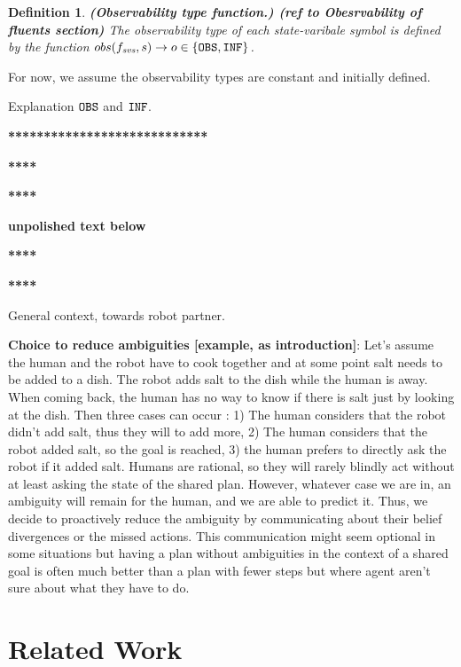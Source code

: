 \documentclass[letterpaper]{article} %
\newtheorem{definition}{Definition}
\begin{document}
\begin{definition}
\textbf{(Observability type function.) (ref to Obesrvability of fluents section)}
The observability type of each \textit{state-varibale symbol} is defined by the function $obs(f_{\textit{svs}}, s) \rightarrow o \in\{\texttt{OBS}, \texttt{INF}\}$.
\end{definition}
For now, we assume the observability types are constant and initially defined.

Explanation $\texttt{OBS}$ and $\texttt{INF}$.


\textbf{****************************}

\textbf{**** }

\textbf{**** }

\textbf{unpolished text below}

\textbf{**** }

\textbf{**** }
% 

General context, towards robot partner. 


\textbf{Choice to reduce ambiguities [example, as introduction]}:
Let's assume the human and the robot have to cook together and at some point salt needs to be added to a dish. The robot adds salt to the dish while the human is away. When coming back, the human has no way to know if there is salt just by looking at the dish.
Then three cases can occur : 1) The human considers that the robot didn't add salt, thus they will to add more, 2) The human considers that the robot added salt, so the goal is reached, 3) the human prefers to directly ask the robot if it added salt. 
Humans are rational, so they will rarely blindly act without at least asking the state of the shared plan. However, whatever case we are in, an ambiguity will remain for the human, and we are able to predict it. Thus, we decide to proactively reduce the ambiguity by communicating about their belief divergences or the missed actions. This communication might seem optional in some situations but having a plan without ambiguities in the context of a shared goal is often much better than a plan with fewer steps but where agent aren't sure about what they have to do.

\section{Related Work}
\end{document}

